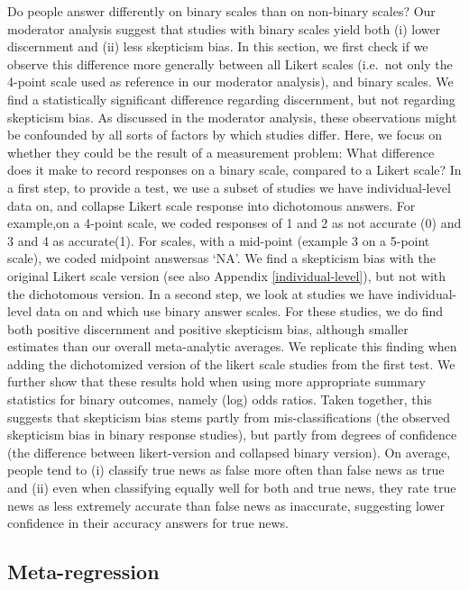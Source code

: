 \documentclass[
  man]{apa6}
\begin{document}
\FloatBarrier

Do people answer differently on binary scales than on non-binary scales? Our moderator analysis suggest that studies with binary scales yield both (i) lower discernment and (ii) less skepticism bias. In this section, we first check if we observe this difference more generally between all Likert scales (i.e.~not only the 4-point scale used as reference in our moderator analysis), and binary scales. We find a statistically significant difference regarding discernment, but not regarding skepticism bias. As discussed in the moderator analysis, these observations might be confounded by all sorts of factors by which studies differ. Here, we focus on whether they could be the result of a measurement problem: What difference does it make to record responses on a binary scale, compared to a Likert scale? In a first step, to provide a test, we use a subset of studies we have individual-level data on, and collapse Likert scale response into dichotomous answers. For example,on a 4-point scale, we coded responses of 1 and 2 as not accurate (0) and 3 and 4 as accurate(1). For scales, with a mid-point (example 3 on a 5-point scale), we coded midpoint answersas `NA'. We find a skepticism bias with the original Likert scale version (see also Appendix \ref{individual-level}), but not with the dichotomous version. In a second step, we look at studies we have individual-level data on and which use binary answer scales. For these studies, we do find both positive discernment and positive skepticism bias, although smaller estimates than our overall meta-analytic averages. We replicate this finding when adding the dichotomized version of the likert scale studies from the first test. We further show that these results hold when using more appropriate summary statistics for binary outcomes, namely (log) odds ratios. Taken together, this suggests that skepticism bias stems partly from mis-classifications (the observed skepticism bias in binary response studies), but partly from degrees of confidence (the difference between likert-version and collapsed binary version). On average, people tend to (i) classify true news as false more often than false news as true and (ii) even when classifying equally well for both and true news, they rate true news as less extremely accurate than false news as inaccurate, suggesting lower confidence in their accuracy answers for true news.

\subsection{Meta-regression}\label{meta-regression}
\end{document}
